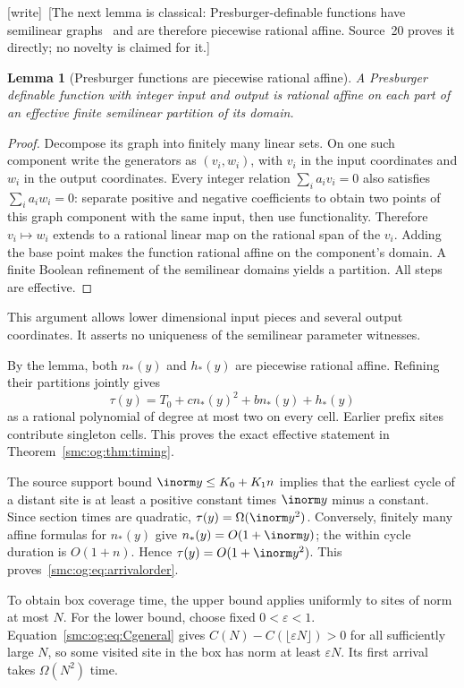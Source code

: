 \documentclass[11pt,letterpaper]{article}
\numberwithin{equation}{section}
\newtheorem{lemma}[theorem]{Lemma}
\theoremstyle{definition}
\theoremstyle{remark}
\newcommand{\wtag}{\textup{[write]}}
\begin{document}
\wtag\ [The next lemma is classical: Presburger-definable functions have semilinear graphs~\cite{ginsburgspanier} and are therefore piecewise rational affine. Source~20 proves it directly; no novelty is claimed for it.]
\begin{lemma}[Presburger functions are piecewise rational affine]\label{smc:og:lem:affine}
A Presburger definable function with integer input and output is rational affine on each part of an effective finite semilinear partition of its domain.
\end{lemma}
\begin{proof}
Decompose its graph into finitely many linear sets. On one such component write the generators as $(v_i,w_i)$, with $v_i$ in the input coordinates and $w_i$ in the output coordinates. Every integer relation $\sum_i a_i v_i=0$ also satisfies $\sum_i a_i w_i=0$: separate positive and negative coefficients to obtain two points of this graph component with the same input, then use functionality. Therefore $v_i\mapsto w_i$ extends to a rational linear map on the rational span of the $v_i$. Adding the base point makes the function rational affine on the component's domain. A finite Boolean refinement of the semilinear domains yields a partition. All steps are effective.
\end{proof}
This argument allows lower dimensional input pieces and several output coordinates. It asserts no uniqueness of the semilinear parameter witnesses.

By the lemma, both $n_*(y)$ and $h_*(y)$ are piecewise rational affine. Refining their partitions jointly gives
\begin{equation}\label{smc:og:eq:firstarrival}
 \tau(y)=T_0+cn_*(y)^2+bn_*(y)+h_*(y)
\end{equation}
as a rational polynomial of degree at most two on every cell. Earlier prefix sites contribute singleton cells. This proves the exact effective statement in Theorem~\ref{smc:og:thm:timing}.

The source support bound $\inorm y\le K_0+K_1n$ implies that the earliest cycle of a distant site is at least a positive constant times $\inorm y$ minus a constant. Since section times are quadratic, $\tau(y)=\Omega(\inorm y^2)$. Conversely, finitely many affine formulas for $n_*(y)$ give $n_*(y)=O(1+\inorm y)$; the within cycle duration is $O(1+n)$. Hence $\tau(y)=O(1+\inorm y^2)$. This proves~\eqref{smc:og:eq:arrivalorder}.

To obtain box coverage time, the upper bound applies uniformly to sites of norm at most $N$. For the lower bound, choose fixed $0<\varepsilon<1$. Equation~\eqref{smc:og:eq:Cgeneral} gives $C(N)-C(\lfloor\varepsilon N\rfloor)>0$ for all sufficiently large $N$, so some visited site in the box has norm at least $\varepsilon N$. Its first arrival takes $\Omega(N^2)$ time.
\end{document}
